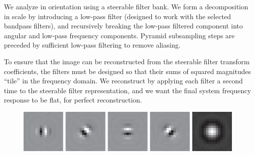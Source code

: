 
We analyze in orientation using a steerable filter bank.  We form a
decomposition in scale by introducing a low-pass filter (designed to
work with the selected bandpass filters), and recursively breaking the
low-pass filtered component into angular and low-pass frequency
components.   Pyramid subsampling steps are preceded by sufficient
low-pass filtering to remove aliasing.

To ensure that the image can be reconstructed from the steerable
filter transform coefficients, the filters must be designed so that
their sums of squared magnitudes ``tile'' in the frequency domain.  We
reconstruct by applying each filter a second time to the steerable
filter representation, and we want the final system frequency response
to be flat, for perfect reconstruction.

\begin{figure}[h!]
\centerline{
\includegraphics[width=0.80\linewidth]{figures/pyramids/steerable_pyr_sp3Filters.eps}
}
\end{figure}


